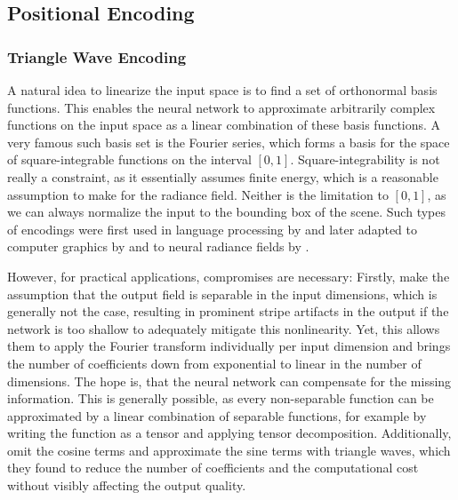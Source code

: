 \subsection{Positional Encoding}

\subsubsection{Triangle Wave Encoding}
A natural idea to linearize the input space is to find a set of orthonormal basis functions.
This enables the neural network to approximate arbitrarily complex functions on the input space as a linear combination of these basis functions.
A very famous such basis set is the Fourier series, which forms a basis for the space of square-integrable functions on the interval $[0, 1]$.
Square-integrability is not really a constraint, as it essentially assumes finite energy, which is a reasonable assumption to make for the radiance field.
Neither is the limitation to $[0, 1]$, as we can always normalize the input to the bounding box of the scene.
Such types of encodings were first used in language processing by \textcite{vaswani2017} and later adapted to computer graphics by \textcite{tancik2020} and to neural radiance fields by \textcite{mildenhall2022}.

However, for practical applications, compromises are necessary:
Firstly, \textcite{tancik2020} make the assumption that the output field is separable in the input dimensions, which is generally not the case, resulting in prominent stripe artifacts in the output if the network is too shallow to adequately mitigate this nonlinearity.
Yet, this allows them to apply the Fourier transform individually per input dimension and brings the number of coefficients down from exponential to linear in the number of dimensions.
The hope is, that the neural network can compensate for the missing information.
This is generally possible, as every non-separable function can be approximated by a linear combination of separable functions, for example by writing the function as a tensor and applying tensor decomposition.
Additionally, \textcite{muller2021} omit the cosine terms and approximate the sine terms with triangle waves, which they found to reduce the number of coefficients and the computational cost without visibly affecting the output quality.

